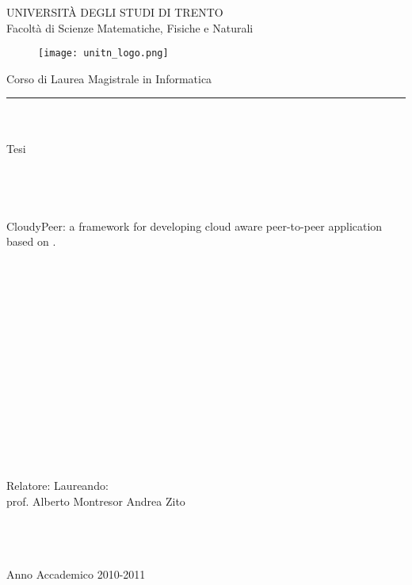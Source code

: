 \documentclass [11pt, a4paper]{report}
\begin{document}


\begin{titlepage}
\begin{center}
\LARGE
UNIVERSIT\`A DEGLI STUDI DI TRENTO\\
\large
Facolt\`a di Scienze Matematiche, Fisiche e Naturali\\
\begin{figure}[htbp]
\centering
\texttt{[image: unitn\_logo.png]}
\end{figure}
\large
Corso di Laurea Magistrale in Informatica\\
\rule{\linewidth}{0.5mm}
\ \\ \ \\
Tesi\\
\ \\ \ \\ \ \\ \ \\
\Large
CloudyPeer: a framework for developing cloud aware peer-to-peer
application based on \cloudcast.
\end{center}

\ \\ \ \\ \ \\ \ \\ \ \\ \ \\ \ \\ \ \\ \ \\ \ \\ \ \\ \ \\ \ \\ \ \\
\large
\flushleft \large Relatore:  \large Laureando:\\
\large prof. Alberto Montresor    \large Andrea Zito\\

\normalsize
\ \\ \ \\ \ \\
\begin{center}
 Anno Accademico 2010-2011
\end{center}
\end{titlepage}

\tableofcontents








{}

\end{document}
